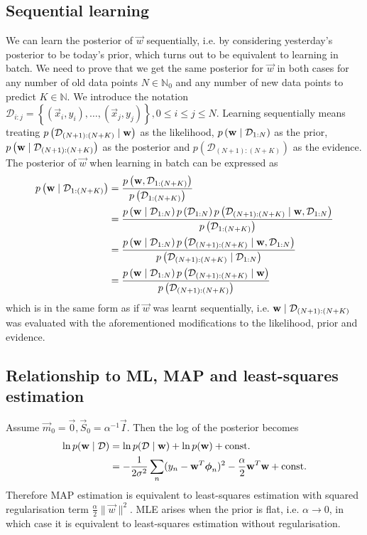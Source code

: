 \subsection{Sequential learning}
We can learn the posterior of $\vec w$ sequentially, i.e. by considering yesterday's posterior to be today's prior, which turns out to be equivalent to learning in batch. We need to prove that we get the same posterior for $\vec w$ in both cases for any number of old data points $N \in \mathbb N_0$ and any number of new data points to predict $K \in \mathbb N$. We introduce the notation $\mathcal D_{i:j} = \left\{(\vec x_i, y_i), \dotsc, (\vec x_j, y_j)\right\}, 0 \leq i \leq j \leq N$. Learning sequentially means treating $p\left(\mathcal D_{(N + 1):(N + K)} \mid \boldsymbol{\mathbf{w}}\right)$ as the likelihood, $p\left(\boldsymbol{\mathbf{w}} \mid \mathcal D_{1:N}\right)$ as the prior, $p\left(\boldsymbol{\mathbf{w}} \mid \mathcal D_{(N + 1):(N + K)}\right)$ as the posterior and $p\left(\mathcal D_{(N + 1):(N + K)}\right)$ as the evidence. The posterior of $\vec w$ when learning in batch can be expressed as
\begin{align*}
	p\left(\boldsymbol{\mathbf{w}} \mid \mathcal D_{1:(N + K)}\right) 	&= \frac{p\left(\boldsymbol{\mathbf{w}}, \mathcal D_{1:(N + K)}\right)}{p\left(\mathcal D_{1:(N + K)}\right)} \\
														&= \frac{p\left(\boldsymbol{\mathbf{w}} \mid \mathcal D_{1:N}\right) p\left(\mathcal D_{1:N}\right) p\left(\mathcal D_{(N + 1):(N + K)} \mid \boldsymbol{\mathbf{w}}, \mathcal D_{1:N}\right)}{p\left(\mathcal D_{1:(N + K)}\right)} \\
														&= \frac{p\left(\boldsymbol{\mathbf{w}} \mid \mathcal D_{1:N}\right) p\left(\mathcal D_{(N + 1):(N + K)} \mid \boldsymbol{\mathbf{w}}, \mathcal D_{1:N}\right)}{p\left(\mathcal D_{(N + 1):(N + K)} \mid \mathcal D_{1:N}\right)} \\
														&= \frac{p\left(\boldsymbol{\mathbf{w}} \mid \mathcal D_{1:N}\right) p\left(\mathcal D_{(N + 1):(N + K)} \mid \boldsymbol{\mathbf{w}}\right)}{p\left(\mathcal D_{(N + 1):(N + K)}\right)}
\end{align*}
which is in the same form as if $\vec w$ was learnt sequentially, i.e. $\boldsymbol{\mathbf{w}} \mid \mathcal D_{(N + 1):(N + K)}$ was evaluated with the aforementioned modifications to the likelihood, prior and evidence.

\subsection{Relationship to ML, MAP and least-squares estimation}
Assume $\vec m_0 = \vec 0, \vec S_0 = \alpha^{-1} \vec I$. Then the log of the posterior becomes
\begin{align*}
	\ln p(\boldsymbol{\mathbf{w}} \mid \mathcal D) 	&= \ln p(\mathcal D \mid \boldsymbol{\mathbf{w}}) + \ln p(\boldsymbol{\mathbf{w}}) + \text{const.} \\
										&= -\frac{1}{2\sigma^2} \sum_n (y_n - \boldsymbol{\mathbf{w}}^T \boldsymbol{\mathbf{\phi}}_n)^2 - \frac{\alpha}{2} \boldsymbol{\mathbf{w}}^T \boldsymbol{\mathbf{w}} + \text{const.}
\end{align*}
Therefore MAP estimation is equivalent to least-squares estimation with squared regularisation term $\frac{\alpha}{2}\|\vec w\|^2$. MLE arises when the prior is flat, i.e. $\alpha \to 0$, in which case it is equivalent to least-squares estimation without regularisation.